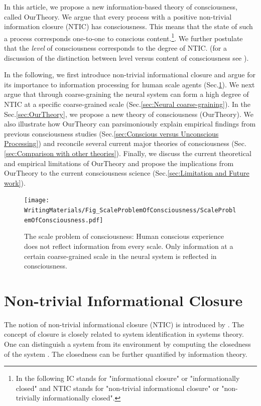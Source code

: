 \documentclass[utf8]{article}
\begin{document}
		In this article, we propose a new information-based theory of consciousness, called \acf{OurTheory}. We argue that every process with a positive non-trivial information closure (NTIC) has consciousness. This means that the state of such a process corresponds one-to-one to conscious content.\footnote{In the following IC stands for "informational closure" or "informationally closed" and NTIC stands for "non-trivial informational closure" or "non-trivially informationally closed".}. We further postulate that the \textit{level} of consciousness corresponds to the degree of NTIC. (for a discussion of the distinction between level versus content of consciousness see \cite{laureys2005neural, overgaard2010neural}).
		
		In the following, we first introduce non-trivial informational closure and argue for its importance to information processing for human scale agents (Sec.\ref{sec:Non-trivial informational closure}). We next argue that through coarse-graining the neural system can form a high degree of NTIC at a specific coarse-grained scale (Sec.\ref{sec:Neural coarse-graining}). In the Sec.\ref{sec:OurTheory}, we propose a new theory of consciousness (\ac{OurTheory}). We also illustrate how \ac{OurTheory} can parsimoniously explain empirical findings from previous consciousness studies (Sec.\ref{sec:Conscious versus Unconscious Processing}) and reconcile several current major theories of consciousness (Sec.\ref{sec:Comparison with other theories}). Finally, we discuss the current theoretical and empirical limitations of \ac{OurTheory} and propose the implications from \ac{OurTheory} to the current consciousness science (Sec.\ref{sec:Limitation and Future work}). 


		\begin{figure}[H]
		    \centering
			\texttt{[image: WritingMaterials/Fig\_ScaleProblemOfConsciousness/ScaleProblemOfConsciousness.pdf]}
			\caption{The scale problem of consciousness: Human conscious experience does not reflect information from every scale. Only information at a certain coarse-grained scale in the neural system is reflected in consciousness.}
			\label{fig:scaleproblem}
	   	\end{figure}


	\section{Non-trivial Informational Closure} \label{sec:Non-trivial informational closure}
		The notion of non-trivial informational closure (NTIC) is introduced by \cite{BERTSCHINGER.2006}. The concept of closure is closely related to system identification in systems theory. One can distinguish a system from its environment by computing the closedness of the system \citep{maturana1991autopoiesis, rosen1991life, pattee2012evolving, luhmann1995probleme}. The closedness can be further quantified by information theory.
\end{document}
